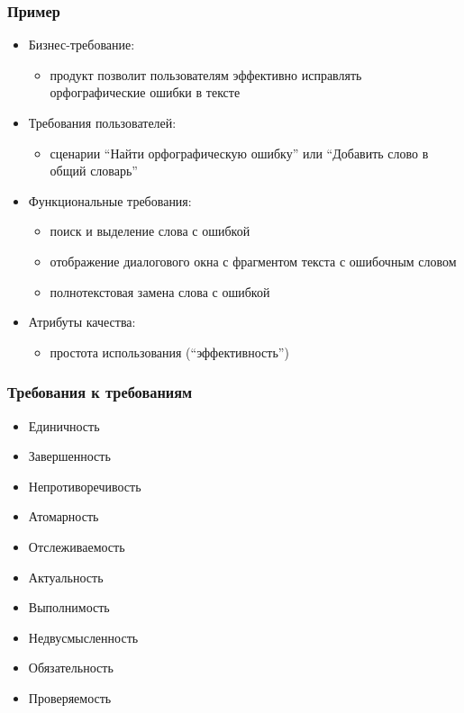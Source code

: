 \documentclass{../../slides-style}
\begin{document}
    \begin{frame}
        \frametitle{Пример}
        \begin{itemize}
            \item Бизнес-требование:
            \begin{itemize}
                \item продукт позволит пользователям эффективно исправлять орфографические ошибки в тексте
            \end{itemize}
            \item Требования пользователей:
            \begin{itemize}
                \item сценарии \enquote{Найти орфографическую ошибку} или \enquote{Добавить слово в общий словарь}
            \end{itemize}
            \item Функциональные требования:
            \begin{itemize}
                \item поиск и выделение слова с ошибкой
                \item отображение диалогового окна с фрагментом текста с ошибочным словом
                \item полнотекстовая замена слова с ошибкой
            \end{itemize}
            \item Атрибуты качества:
            \begin{itemize}
                \item простота использования (\enquote{эффективность})
            \end{itemize}
        \end{itemize}
    \end{frame}

    \begin{frame}
        \frametitle{Требования к требованиям}
        \begin{itemize}
            \item Единичность
            \item Завершенность
            \item Непротиворечивость
            \item Атомарность
            \item Отслеживаемость
            \item Актуальность
            \item Выполнимость
            \item Недвусмысленность
            \item Обязательность
            \item Проверяемость
        \end{itemize}
    \end{frame}
\end{document}
